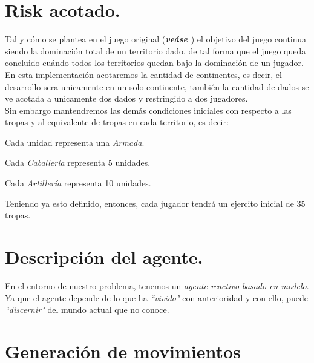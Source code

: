 \documentclass[12pt,twocolumn,draft]{article}
\begin{document}
\section{Risk acotado.}

Tal y c\'omo se plantea en el juego original (\textbf{\textit{ve\'ase \cite{RISK}}}) el objetivo del juego continua siendo la dominaci\'on total de un territorio dado, de tal forma
que el juego queda concluido cu\'ando todos los territorios quedan bajo la dominaci\'on de 
un jugador.\\
En esta implementaci\'on acotaremos la cantidad de continentes, es decir, el desarrollo sera unicamente en un solo continente, tambi\'en la cantidad de dados se ve acotada a unicamente dos dados y restringido a dos jugadores.\\

Sin embargo mantendremos las dem\'as condiciones iniciales con respecto a las tropas y al equivalente de tropas en cada territorio, es decir:
\begin{list}{*}{}
\item Cada unidad representa una \textit{Armada}.
\item Cada \textit{Caballer\'ia} representa 5 unidades.
\item Cada \textit{Artiller\'ia} representa 10 unidades.
\end{list}

Teniendo ya esto definido, entonces, cada jugador tendr\'a un ejercito inicial de 35 tropas.

\section{Descripci\'on del agente.}

En el entorno de nuestro problema, tenemos un \textit{agente reactivo basado en modelo}.
Ya que el agente depende de lo que ha \textit{``vivido"} con anterioridad y con ello, puede
\textit{``discernir"} del mundo actual que no conoce.

\section{Generaci\'on de movimientos}
\end{document}
